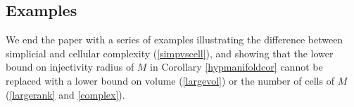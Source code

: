 \documentclass[11pt,letterpaper]{amsart}
\newtheorem{corollary}[theorem]{Corollary}
\newtheorem*{remark}{Remark}
\begin{document}
\subsection*{Examples} We end the paper with a series of examples illustrating the difference between simplicial and cellular complexity (\ref{simpvscell}), and showing that the lower bound on injectivity radius of $M$ in Corollary \ref{hypmanifoldcor} cannot be replaced with a lower bound on volume (\ref{largevol}) or the number of cells of $M$ (\ref{largerank} and \ref{complex}). 



 

\end{document}
